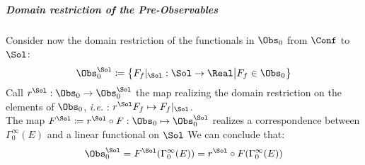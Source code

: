 \documentclass[Main]{subfiles}
\begin{document}
			\subparagraph{Domain restriction of the Pre-Observables} 
			  		
				Consider now the domain restriction of the functionals in $\Obs_0$ from $\Conf$ to $\Sol$:
   					\begin{displaymath}
   						\Obs_0^\Sol \coloneqq \big\{F_f\vert_\Sol : \Sol \rightarrow \Real \big \vert F_f \in \Obs_0 \big\}
   					\end{displaymath}
				Call $r^\Sol : \Obs_0 \rightarrow \Obs_0^\Sol$ the map realizing the domain restriction on the elements of $\Obs_0$, \textit{i.e.} : $r^\Sol F_f \mapsto F_f \vert_\Sol $.\\
				The map $F^\Sol \coloneqq r^\Sol \circ F : \Obs_0 \mapsto \Obs_0^\Sol $ realizes a correspondence between $\Gamma_0^\infty(E)$ and a linear functional on $\Sol$
				We can conclude that:
				\begin{displaymath}
					\Obs_0^\Sol = F^\Sol ( \Gamma_0^\infty(E)) = r^\Sol \circ F (\Gamma_0^\infty(E)) 
				\end{displaymath}				   					
   					
\end{document}
